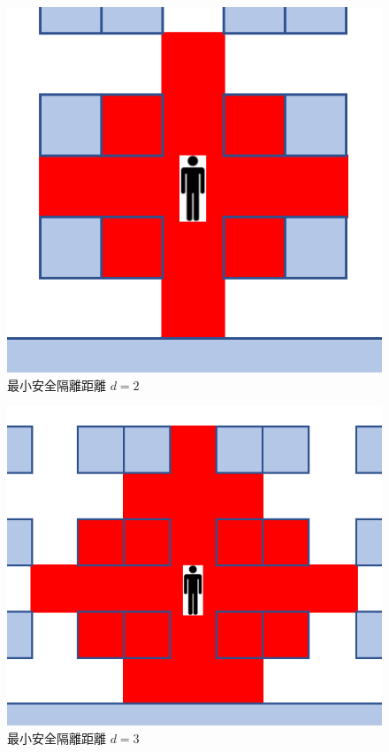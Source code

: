 \begin{figure}[h]
    \centering
    \includegraphics[scale=0.5]{figures/4_d=2.png}
    \caption{最小安全隔離距離 $d=2$}
    \label{fig:d=2}
\end{figure}

\begin{figure}[h]
    \centering
    \includegraphics[scale=0.5]{figures/4_d=3.png}
    \caption{最小安全隔離距離 $d=3$}
    \label{fig:d=3}
\end{figure}


